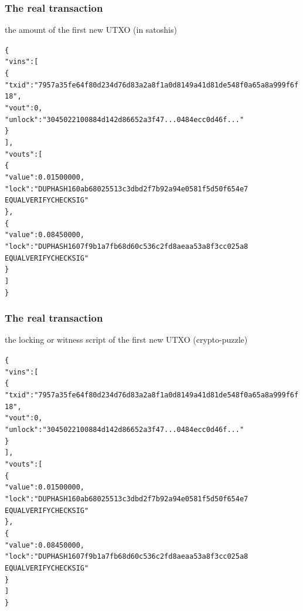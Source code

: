 \documentclass[11pt]{beamer}  %
\begin{document}
\begin{frame}[fragile]\frametitle{The real transaction}

  \begin{center}
    the amount of the first new UTXO (in satoshis)
  \end{center}

  {\scriptsize\begin{alltt}
\{
  "vins": [
    \{
      "txid": "7957a35fe64f80d234d76d83a2a8f1a0d8149a41d81de548f0a65a8a999f6f18",
      "vout": 0,
      "unlock": "3045022100884d142d86652a3f47... 0484ecc0d46f..."
    \}
  ],
  "vouts": [
    \{
      \alert{"value": 0.01500000},
      "lock": "DUP HASH160 ab68025513c3dbd2f7b92a94e0581f5d50f654e7
               EQUALVERIFY CHECKSIG"
    \},
    \{
      "value": 0.08450000,
      "lock": "DUP HASH160 7f9b1a7fb68d60c536c2fd8aeaa53a8f3cc025a8
               EQUALVERIFY CHECKSIG"
    \}
  ]
\}
\end{alltt}}

\end{frame}

\begin{frame}[fragile]\frametitle{The real transaction}

  \begin{center}
    the locking or witness script of the first new UTXO (crypto-puzzle)
  \end{center}

  {\scriptsize\begin{alltt}
\{
  "vins": [
    \{
      "txid": "7957a35fe64f80d234d76d83a2a8f1a0d8149a41d81de548f0a65a8a999f6f18",
      "vout": 0,
      "unlock": "3045022100884d142d86652a3f47... 0484ecc0d46f..."
    \}
  ],
  "vouts": [
    \{
      "value": 0.01500000,
      \alert{"lock": "DUP HASH160 ab68025513c3dbd2f7b92a94e0581f5d50f654e7
               EQUALVERIFY CHECKSIG"}
    \},
    \{
      "value": 0.08450000,
      "lock": "DUP HASH160 7f9b1a7fb68d60c536c2fd8aeaa53a8f3cc025a8
               EQUALVERIFY CHECKSIG"
    \}
  ]
\}
\end{alltt}}

\end{frame}
\end{document}
